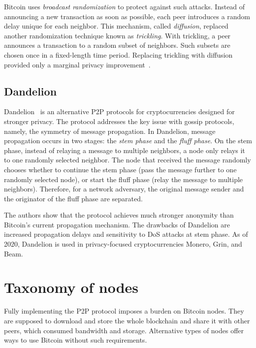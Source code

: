 Bitcoin uses \textit{broadcast randomization} to protect against such attacks.
Instead of announcing a new transaction as soon as possible, each peer introduces a random delay unique for each neighbor.
This mechanism, called \textit{diffusion}, replaced~\cite{Wuille} another randomization technique known as \textit{trickling}.
With trickling, a peer announces a transaction to a random subset of neighbors.
Such subsets are chosen once in a fixed-length time period.
Replacing trickling with diffusion provided only a marginal privacy improvement~\cite{Fanti2017}.


\subsection{Dandelion}
\label{sec:Dandelion}

Dandelion~\cite{Venkatakrishnan2017, Fanti2018} is an alternative P2P protocols for cryptocurrencies designed for stronger privacy.
The protocol addresses the key issue with gossip protocols, namely, the symmetry of message propagation.
In Dandelion, message propagation occurs in two stages: the \textit{stem phase} and the \textit{fluff phase}.
On the stem phase, instead of relaying a message to multiple neighbors, a node only relays it to one randomly selected neighbor.
The node that received the message randomly chooses whether to continue the stem phase (pass the message further to one randomly selected node), or start the fluff phase (relay the message to multiple neighbors).
Therefore, for a network adversary, the original message sender and the originator of the fluff phase are separated.

The authors show that the protocol achieves much stronger anonymity than Bitcoin's current propagation mechanism.
The drawbacks of Dandelion are increased propagation delays and sensitivity to DoS attacks at stem phase.
As of 2020, Dandelion is used in privacy-focused cryptocurrencies Monero, Grin, and Beam.


\section{Taxonomy of nodes}

Fully implementing the P2P protocol imposes a burden on Bitcoin nodes.
They are supposed to download and store the whole blockchain and share it with other peers, which consumed bandwidth and storage.
Alternative types of nodes offer ways to use Bitcoin without such requirements.

